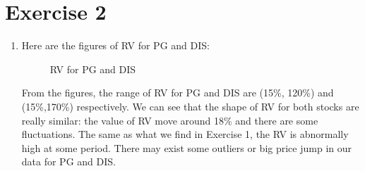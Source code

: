 \documentclass[12pt,letterpaper]{article}
\begin{document}
\section*{Exercise 2}
  \begin{enumerate}[label=\textbf{(\Alph*)}]
\item
Here are the figures of RV for PG and DIS:
 \begin{figure}[H]
            \centering
            \caption{RV for PG and DIS}
\end{figure}

From the figures, the range of RV for PG and DIS are (15\%, 120\%) and (15\%,170\%) respectively. We can see that the shape of RV for both stocks are really similar: the value of RV move around 18\% and there are some fluctuations. The same as what we find in Exercise 1, the RV is abnormally high at some period. There may exist some outliers or big price jump in our data for PG and DIS.\\


\end{enumerate}
\end{document}
